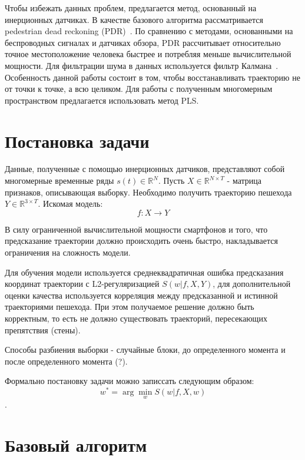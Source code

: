 \documentclass[12pt,twoside]{article}
\begin{document}
Чтобы избежать данных проблем, предлагается метод, основанный на инерционных датчиках. В качестве базового алгоритма рассматривается pedestrian dead reckoning (PDR)~\cite{7743695}. По сравнению с методами, основанными на беспроводных сигналах и датчиках обзора, PDR рассчитывает относительно точное местоположение человека быстрее и потребляя меньше вычислительной мощности. Для фильтрации шума в данных используется фильтр Калмана~\cite{journals/corr/abs-1712-09004}. Особенность данной работы состоит в том, чтобы восстанавливать траекторию не от точки к точке, а всю целиком. Для работы с полученным многомерным пространством предлагается использовать метод PLS\cite{10.1007/11752790_2}.

\section{Постановка задачи}
Данные, полученные с помощью инерционных датчиков, представляют собой многомерные временные ряды $s(t) \in \mathbb{R}^N$. Пусть $X \in \mathbb{R}^{N \times T}$ - матрица признаков, описывающая выборку. Необходимо получить траекторию пешехода  $Y \in \mathbb{R}^{3 \times T}$. Искомая модель:
\[f: X \to Y\]

В силу ограниченной вычислительной мощности смартфонов и того, что предсказание траектории должно происходить очень быстро, накладывается ограничения на сложность модели. 

Для обучения модели используется среднеквадратичная ошибка предсказания координат траектории с L2-регуляризацией $S(w|f, X, Y)$, для дополнительной оценки качества используется корреляция между предсказанной и истинной траекториями пешехода. При этом получаемое решение должно быть корректным, то есть не должно существовать траекторий, пересекающих препятствия (стены).

Способы разбиения выборки - случайные блоки, до определенного момента и после определенного момента (?).

Формально постановку задачи можно записсать следующим образом:
\[w^* = \arg\min_{w}S(w|f, X, w)\].

\section{Базовый алгоритм}





\end{document}

